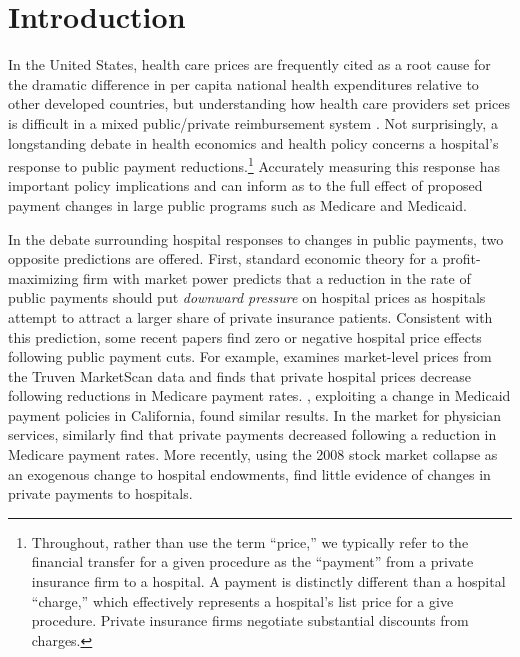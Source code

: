 \documentclass[12pt]{article}
\begin{document}
\newpage
\section{Introduction}
\onehalfspacing

In the United States, health care prices are frequently cited as a root cause for the dramatic difference in per capita national health expenditures relative to other developed countries, but understanding how health care providers set prices is difficult in a mixed public/private reimbursement system \citep{anderson2003}.  Not surprisingly, a longstanding debate in health economics and health policy concerns a hospital's response to public payment reductions.\footnote{Throughout, rather than use the term ``price,'' we typically refer to the financial transfer for a given procedure as the ``payment'' from a private insurance firm to a hospital. A payment is distinctly different than a hospital ``charge,'' which effectively represents a hospital's list price for a give procedure. Private insurance firms negotiate substantial discounts from charges.} Accurately measuring this response has important policy implications and can inform as to the full effect of proposed payment changes in large public programs such as Medicare and Medicaid.

In the debate surrounding hospital responses to changes in public payments, two opposite predictions are offered. First, standard economic theory for a profit-maximizing firm with market power predicts that a reduction in the rate of public payments should put \textit{downward pressure} on hospital prices as hospitals attempt to attract a larger share of private insurance patients. Consistent with this prediction, some recent papers find zero or negative hospital price effects following public payment cuts. For example, \cite{white2013} examines market-level prices from the Truven MarketScan data and finds that private hospital prices decrease following reductions in Medicare payment rates. \citet{dranove1998}, exploiting a change in Medicaid payment policies in California, found similar results. In the market for physician services, \cite{clemens2017} similarly find that private payments decreased following a reduction in Medicare payment rates. More recently, using the 2008 stock market collapse as an exogenous change to hospital endowments, \cite{dranove2017} find little evidence of changes in private payments to hospitals.
\end{document}
